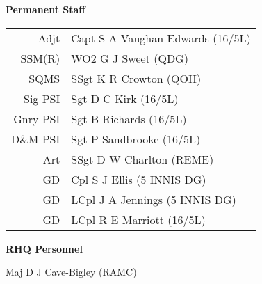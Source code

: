 \vspace*{10mm}

\begin{center}
  \Large
  \textbf{Permanent Staff}
\end{center}

\begin{center}
  \begin{tabular}{rl}
    Adjt & Capt S A Vaughan-Edwards (16/5L) \\
    SSM(R) & WO2 G J Sweet (QDG) \\
    SQMS & SSgt K R Crowton (QOH) \\
    Sig PSI & Sgt D C Kirk (16/5L) \\
    Gnry PSI & Sgt B Richards (16/5L) \\
    D\&M PSI & Sgt P Sandbrooke (16/5L) \\
    Art & SSgt D W Charlton (REME) \\
    GD & Cpl S J Ellis (5 INNIS DG) \\
    GD & LCpl J A Jennings (5 INNIS DG) \\
    GD & LCpl R E Marriott (16/5L) \\
  \end{tabular}
\end{center}

\vspace*{10mm}

\begin{center}
  \Large
  \textbf{RHQ Personnel}
\end{center}

\begin{center}
  Maj D J Cave-Bigley (RAMC)
\end{center}
